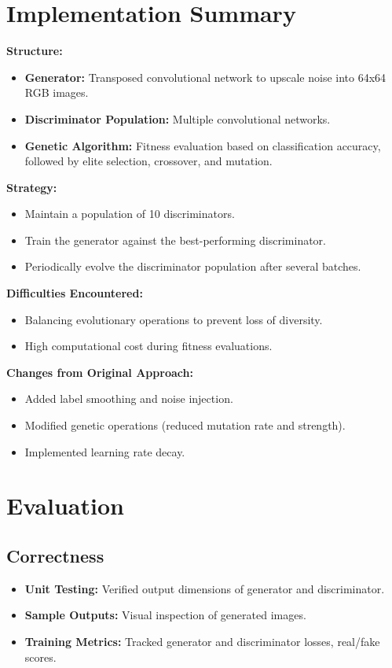 \documentclass[12pt]{article}
\begin{document}
\section{Implementation Summary}
\textbf{Structure:}
\begin{itemize}
    \item \textbf{Generator:} Transposed convolutional network to upscale noise into 64x64 RGB images.
    \item \textbf{Discriminator Population:} Multiple convolutional networks.
    \item \textbf{Genetic Algorithm:} Fitness evaluation based on classification accuracy, followed by elite selection, crossover, and mutation.
\end{itemize}

\textbf{Strategy:}
\begin{itemize}
    \item Maintain a population of 10 discriminators.
    \item Train the generator against the best-performing discriminator.
    \item Periodically evolve the discriminator population after several batches.
\end{itemize}

\textbf{Difficulties Encountered:}
\begin{itemize}
    \item Balancing evolutionary operations to prevent loss of diversity.
    \item High computational cost during fitness evaluations.
\end{itemize}

\textbf{Changes from Original Approach:}
\begin{itemize}
    \item Added label smoothing and noise injection.
    \item Modified genetic operations (reduced mutation rate and strength).
    \item Implemented learning rate decay.
\end{itemize}

\section{Evaluation}

\subsection{Correctness}
\begin{itemize}
    \item \textbf{Unit Testing:} Verified output dimensions of generator and discriminator.
    \item \textbf{Sample Outputs:} Visual inspection of generated images.
    \item \textbf{Training Metrics:} Tracked generator and discriminator losses, real/fake scores.
\end{itemize}
\end{document}
